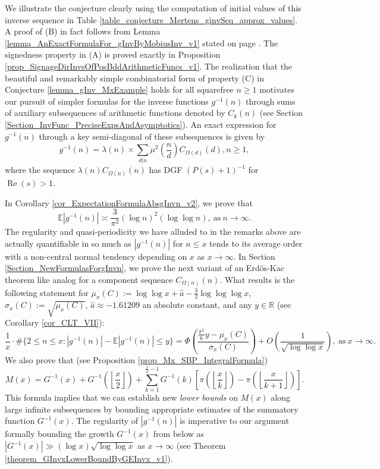 \documentclass[11pt,reqno,a4letter]{article}
\numberwithin{figure}{section}
\numberwithin{table}{section}
\newcommand{\Floor}[2]{\ensuremath{\left\lfloor \frac{#1}{#2} \right\rfloor}}
\theoremstyle{plain}
\numberwithin{theorem}{section}
\theoremstyle{definition}
\renewcommand{\Re}{\operatorname{Re}}
\begin{document}
We illustrate the conjecture clearly using the computation of initial values of 
this inverse sequence in 
Table \ref{table_conjecture_Mertens_ginvSeq_approx_values}. 
A proof of (B) in fact follows from 
Lemma \ref{lemma_AnExactFormulaFor_gInvByMobiusInv_v1} 
stated on page \pageref{lemma_AnExactFormulaFor_gInvByMobiusInv_v1}. 
The signedness property in (A) is proved exactly in 
Proposition \ref{prop_SignageDirInvsOfPosBddArithmeticFuncs_v1}. 
The realization that the beautiful and remarkably simple combinatorial form of property (C) 
in Conjecture \ref{lemma_gInv_MxExample} holds for all squarefree $n \geq 1$ 
motivates our pursuit of simpler formulas for the inverse functions $g^{-1}(n)$ 
through sums of auxiliary subsequences of arithmetic functions denoted by $C_k(n)$  
(see Section \ref{Section_InvFunc_PreciseExpsAndAsymptotics}). 
An exact expression for $g^{-1}(n)$ through a key semi-diagonal of these subsequences 
is given by 
\[
g^{-1}(n) = \lambda(n) \times \sum_{d|n} \mu^2\left(\frac{n}{d}\right) C_{\Omega(d)}(d), n \geq 1,  
\]
where the sequence $\lambda(n) C_{\Omega(n)}(n)$ has DGF $(P(s)+1)^{-1}$ for $\Re(s) > 1$. 

In Corollary \ref{cor_ExpectationFormulaAbsgInvn_v2}, we prove that 
\[
\mathbb{E}|g^{-1}(n)| \asymp \frac{3}{\pi^2} (\log n)^2 (\log\log n), 
     \mathrm{\ as\ } n \rightarrow \infty. 
\]
The regularity and quasi-periodicity we have alluded to in the remarks above are actually 
quantifiable in so much as $|g^{-1}(n)|$ for $n \leq x$ 
tends to its average order with a non-central normal tendency 
depending on $x$ as $x \rightarrow \infty$. 
In Section \ref{Section_NewFormulasForgInvn}, 
we prove the next variant of an Erd\"os-Kac theorem like analog
for a component sequence $C_{\Omega(n)}(n)$. 
What results is the following statement for 
$\mu_x(C) := \log\log x + \hat{a} - \frac{3}{2}\log\log\log x$, $\sigma_x(C) := \sqrt{\mu_x(C)}$, 
$\hat{a} \approx -1.61209$ an absolute constant, and any $y \in \mathbb{R}$ (see 
Corollary \ref{cor_CLT_VII}): 
\[
\frac{1}{x} \cdot \#\{2 \leq n \leq x: |g^{-1}(n)| - \mathbb{E}|g^{-1}(n)| \leq y\} = 
     \Phi\left(\frac{\frac{\pi^2}{6}y - \mu_x(C)}{\sigma_x(C)}\right) + 
     O\left(\frac{1}{\sqrt{\log\log x}}\right), 
     \mathrm{\ as\ } x \rightarrow \infty. 
\]
We also prove that (see Proposition \ref{prop_Mx_SBP_IntegralFormula}) 
\begin{equation} 
\label{eqn_Mx_gInvnPixk_formula_v2} 
M(x) = G^{-1}(x) + G^{-1}\left(\Floor{x}{2}\right) + 
     \sum_{k=1}^{\frac{x}{2}-1} G^{-1}(k) \left[ 
     \pi\left(\Floor{x}{k}\right) - \pi\left(\Floor{x}{k+1}\right) 
     \right]. 
\end{equation} 
This formula 
implies that we can establish new \emph{lower bounds} on $M(x)$ along large infinite subsequences 
by bounding appropriate estimates of the summatory function $G^{-1}(x)$. 
The regularity of $|g^{-1}(n)|$ is imperative to our argument formally bounding the growth 
$G^{-1}(x)$ from below as $|G^{-1}(x)| \gg (\log x) \sqrt{\log\log x}$ as $x \rightarrow \infty$ 
(see Theorem \ref{theorem_GInvxLowerBoundByGEInvx_v1}). 
\end{document}
